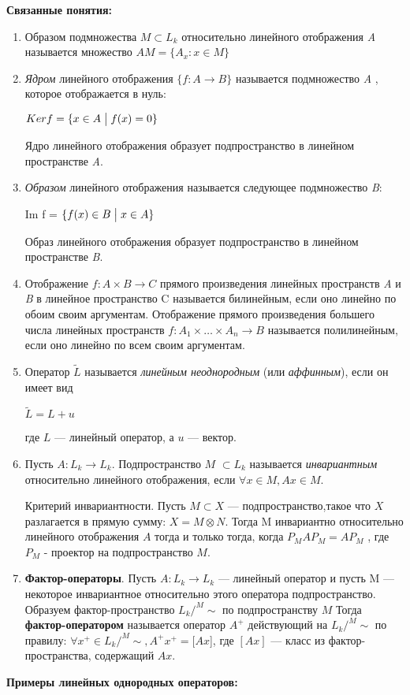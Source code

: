 {\large {\bf Связанные понятия:}}
\begin{enumerate}
\item Образом подмножества $  M  \subset  L_k$ относительно линейного отображения {\it A} называется множество $AM=\{A_x\colon x \in M\}$
\item \textit{Ядром}  линейного отображения $\{f\colon A \to B \}$ называется подмножество {\it A} , которое отображается в нуль: 

\medskip
$Ker f = \{x \in A \bigm | f(x)=0\}$ 


Ядро линейного отображения образует подпространство в линейном пространстве {\it A}.
\item \textit{Образом} линейного отображения  называется следующее подмножество {\it B}:

\medskip
Im f =  $\{f(x) \in B \bigm | x \in A\}$


Образ линейного отображения образует подпространство в линейном пространстве {\it B}.

\medskip
\item Отображение $f\colon A \times B \to C $ прямого произведения линейных пространств {\it A} и {\it B} в линейное пространство C называется билинейным, если оно линейно по обоим своим аргументам. Отображение прямого произведения большего числа линейных пространств $f\colon A_1 \times\dots\times A_n \to B$ называется полилинейным, если оно линейно по всем своим аргументам.
\item Оператор $\widetilde{L}$ называется \textit{линейным неоднородным} (или \textit{аффинным}), если он имеет вид

$\widetilde{L} = L+u$

где $L$ --- линейный оператор, а $u$ --- вектор.
\item Пусть $A\colon L_k \to L_k$. Подпространство $M$  $\subset  L_k$ называется \textit{инвариантным} относительно линейного отображения, если $\forall x \in M , Ax \in M$.

Критерий инвариантности. Пусть $ M \subset X$ --- подпространство,такое что $X$ разлагается в прямую сумму: $X= M \otimes N$. Тогда M инвариантно относительно линейного отображения $A$ тогда и только тогда, когда $P_M A P_M = AP_M$ , где $ P_M$ - проектор на подпространство $M$.
\item {\bf Фактор-операторы}. Пусть $A \colon L_k \to L_k$ --- линейный оператор и пусть M --- некоторое инвариантное относительно этого оператора подпространство. Образуем фактор-пространство $ L_k\bigl/^M\sim$ по подпространству $M$ Тогда {\bf фактор-оператором} называется оператор $A^+$ действующий на $ L_k\bigl/^M\sim$ по правилу: $\forall x^+ \in  L_k\bigl/^M\sim, A^+ x^+ = [Ax$], где $[Ax]$ --- класс из фактор-пространства, содержащий $Ax$.
\end{enumerate}
{\large {\bf Примеры линейных однородных операторов:}}

